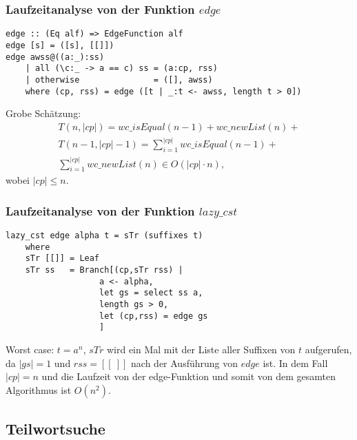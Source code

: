\documentclass{beamer}
\begin{document}
\begin{frame}[fragile]
\frametitle{Laufzeitanalyse von der Funktion $edge$}
\begin{lstlisting}
edge :: (Eq alf) => EdgeFunction alf
edge [s] = ([s], [[]])
edge awss@((a:_):ss)
    | all (\c:_ -> a == c) ss = (a:cp, rss)
    | otherwise               = ([], awss)
    where (cp, rss) = edge ([t | _:t <- awss, length t > 0])
\end{lstlisting}
Grobe Schätzung:
\begin{gather*}
    T(n,|cp|) = wc\_isEqual(n - 1) + wc\_newList(n) + \\T(n-1,|cp|-1) =
    \sum_{i = 1}^{|cp|}{wc\_isEqual(n-1)} + \\ \sum_{i = 1}^{|cp|}{wc\_newList(n)} \in O(|cp| \cdot n),
\end{gather*}
wobei $|cp| \le n$.
\end{frame}

\begin{frame}[fragile]
\frametitle{Laufzeitanalyse von der Funktion $lazy\_cst$}
\begin{lstlisting}
lazy_cst edge alpha t = sTr (suffixes t)
    where
    sTr [[]] = Leaf
    sTr ss   = Branch[(cp,sTr rss) |
                   a <- alpha,
                   let gs = select ss a,
                   length gs > 0,
                   let (cp,rss) = edge gs
                   ]
\end{lstlisting}
\begin{example}
Worst case: $t = a^n$, $sTr$ wird ein Mal mit der Liste aller Suffixen von $t$ aufgerufen, da $|gs| = 1$ und $rss = [[\:]]$ nach der Ausführung von $edge$ ist. In dem Fall $|cp| = n$ und die Laufzeit von der edge-Funktion und somit von dem gesamten Algorithmus ist $O(n^2)$.
\end{example}
\end{frame}

\subsection{Teilwortsuche}
\end{document}

